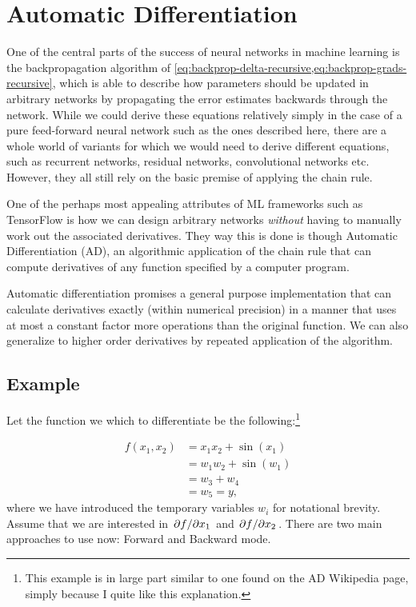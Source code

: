 \documentclass[Thesis.tex]{subfiles}
\begin{document}
\chapter{Automatic Differentiation}
\label{chp:auto-diff}

One of the central parts of the success of neural networks in machine learning
is the backpropagation algorithm of
\cref{eq:backprop-delta-recursive,eq:backprop-grads-recursive}, which is able to
describe how parameters should be updated in arbitrary networks by propagating
the error estimates backwards through the network. While we could derive these
equations relatively simply in the case of a pure feed-forward neural network
such as the ones described here, there are a whole world of variants for which
we would need to derive different equations, such as recurrent networks,
residual networks, convolutional networks etc. However, they all still rely on the basic
premise of applying the chain rule.

One of the perhaps most appealing attributes of ML frameworks such as TensorFlow
is how we can design arbitrary networks \emph{without} having to manually work
out the associated derivatives. They way this is done is though Automatic
Differentiation (AD), an algorithmic application of the chain rule that can
compute derivatives of any function specified by a computer program.

Automatic differentiation promises a general purpose implementation that can
calculate derivatives exactly (within numerical precision) in a manner that uses
at most a constant factor more operations than the original function. We can
also generalize to higher order derivatives by repeated application of the algorithm.


\section{Example}

Let the function we which to differentiate be the following:\footnote{This example is in large part similar to one found
    on the AD Wikipedia page, simply because I quite like this explanation.}

\begin{align}
  f(x_1, x_2) &= x_1x_2 + \sin(x_1)\\
              &= w_1w_2 + \sin(w_1)\\
              &= w_3 + w_4\\
              &= w_5 = y,
\end{align}
where we have introduced the temporary variables $w_i$ for notational brevity.
Assume that we are interested in $\pdv*{f}{x_1}$ and $\pdv*{f}{x_2}$. There are
two main approaches to use now: Forward and Backward mode.
\end{document}
